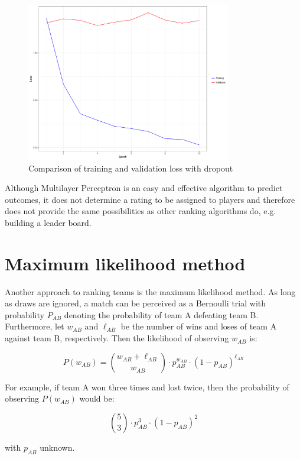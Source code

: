 \begin{figure}[H]
\caption{Comparison of training and validation loss with dropout}
\centering
\includegraphics[width=0.8\textwidth]{figs/overfitting_dropout}
\end{figure}

Although Multilayer Perceptron is an easy and effective algorithm to predict outcomes, it does not determine a rating to be assigned to players and therefore does not provide the same possibilities as other ranking algorithms do, e.g. building a leader board.

\section{Maximum likelihood method}
Another approach to ranking teams is the maximum likelihood method. As long as draws are ignored, a match can be perceived as a Bernoulli trial with probability $P_{AB}$ denoting the probability of team A defeating team B. Furthermore, let $w_{AB}$ and $\ell_{AB}$ be the number of wins and loses of team A against team B, respectively. Then the likelihood of observing $w_{AB}$ is:

\begin{equation}
\label{eq:maximum_likelihood}
P(w_{AB}) = {{w_{AB} + \ell_{AB}}\choose{w_{AB}}}\cdot p_{AB}^{w_{AB}}\cdot {(1-p_{AB})}^{\ell_{AB}}
\end{equation}

\examplespace
\begin{example}
For example, if team A won three times and lost twice, then the probability of observing $P(w_{AB})$ would be:

\begin{equation*}
{{5}\choose{3}}\cdot p_{AB}^{3}\cdot {(1-p_{AB})}^{2}
\end{equation*}

\noindent with $p_{AB}$ unknown.
\end{example}

